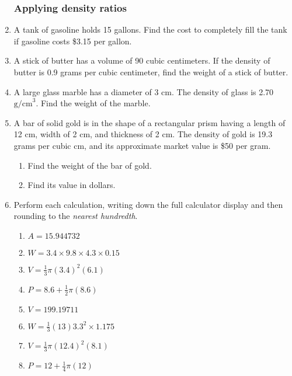 \documentclass[12pt, twoside]{article}
\begin{document}
\begin{enumerate}
  \newpage
  \subsubsection*{Applying density ratios}
  \item A tank of gasoline holds 15 gallons. Find the cost to completely fill the tank if gasoline costs \$3.15 per gallon. \vspace{3cm}
  \item A stick of butter has a volume of 90 cubic centimeters. If the density of butter is 0.9 grams per cubic centimeter, find the weight of a stick of butter. \vspace{3cm}
  \item A large glass marble has a diameter of 3 cm. The density of glass is 2.70 $\mathrm{g/cm}^3$. Find the weight of the marble. \vspace{3cm}

  \item A bar of solid gold is in the shape of a rectangular prism having a length of 12 cm, width of 2 cm, and thickness of 2 cm. The density of gold is 19.3 grams per cubic cm, and its approximate market value is \$50 per gram.
  \begin{enumerate}
    \item Find the weight of the bar of gold.  \vspace{3cm}
    \item Find its value in dollars.
  \end{enumerate}

\newpage
  \item Perform each calculation, writing down the full calculator display and then rounding to the \emph{nearest hundredth}.
    \begin{multicols}{2}
    \begin{enumerate}[itemsep=4cm]
      \item $A=15.944732$
      \item $W=3.4 \times 9.8 \times 4.3 \times 0.15$
            
      \item $V=\frac{1}{3} \pi (3.4)^2(6.1)$
      \item $P=8.6 + \frac{1}{2} \pi (8.6)$  
      \item $V=199.19711$
      \item $W=\frac{1}{3} (13)  3.3^2 \times 1.175$
      \item $V=\frac{1}{3} \pi (12.4)^2(8.1)$
      \item $P=12 + \frac{1}{4} \pi (12)$ 
    \end{enumerate}
    \end{multicols}\vspace{2cm}


\end{enumerate}
\end{document}
